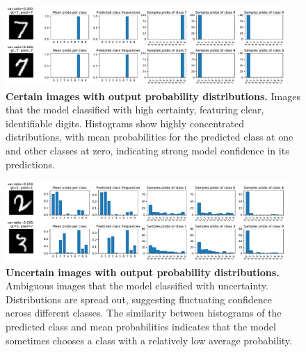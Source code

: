 \begin{figure}[H]
    \centering
    \includegraphics[width=0.95\textwidth]{var-ratio_certain_images.pdf}
    \caption{\textbf{Certain images with output probability distributions.} Images that the model classified with high certainty, featuring clear, identifiable digits. Histograms show highly concentrated distributions, with mean probabilities for the predicted class at one and other classes at zero, indicating strong model confidence in its predictions.}
    \label{fig:varratio_certain}
\end{figure}
\begin{figure}[H]
    \centering
    \includegraphics[width=0.95\textwidth]{var-ratio_uncertain_images.pdf}
    \caption{\textbf{Uncertain images with output probability distributions.} Ambiguous images that the model classified with uncertainty. Distributions are spread out, suggesting fluctuating confidence across different classes. The similarity between histograms of the predicted class and mean probabilities indicates that the model sometimes chooses a class with a relatively low average probability.}
    \label{fig:varratio_uncertain}
\end{figure}
